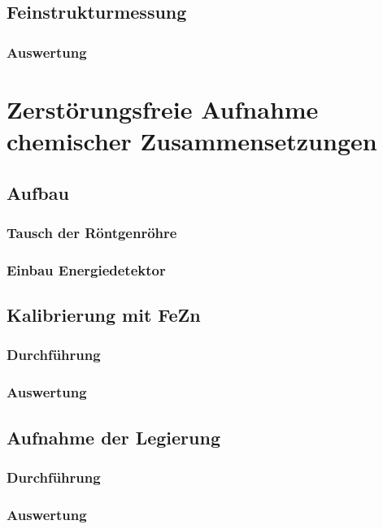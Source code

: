 \section{Feinstrukturmessung}

\subsection{Auswertung}

\chapter{Zerstörungsfreie Aufnahme chemischer Zusammensetzungen}

\section{Aufbau}

\subsection{Tausch der Röntgenröhre}

\subsection{Einbau Energiedetektor}

\section{Kalibrierung mit FeZn}

\subsection{Durchführung}

\subsection{Auswertung}

\section{Aufnahme der Legierung}

\subsection{Durchführung}

\subsection{Auswertung}


